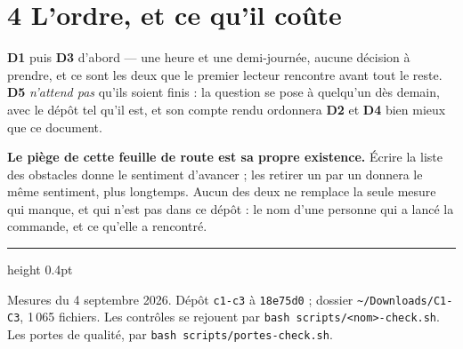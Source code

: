 \documentclass[11pt]{article}
\newcommand{\code}[1]{\texttt{\small #1}}
\newcommand{\mm}[1]{\textbf{#1}}
\begin{document}
\section{4 \;\textbar\; L'ordre, et ce qu'il coûte}

\mm{D1} puis \mm{D3} d'abord --- une heure et une demi-journée, aucune décision à prendre, et ce
sont les deux que le premier lecteur rencontre avant tout le reste. \mm{D5} \emph{n'attend pas}
qu'ils soient finis : la question se pose à quelqu'un dès demain, avec le dépôt tel qu'il est, et
son compte rendu ordonnera \mm{D2} et \mm{D4} bien mieux que ce document.

\begin{these}
\textbf{Le piège de cette feuille de route est sa propre existence.} Écrire la liste des obstacles
donne le sentiment d'avancer ; les retirer un par un donnera le même sentiment, plus longtemps.
Aucun des deux ne remplace la seule mesure qui manque, et qui n'est pas dans ce dépôt : le nom
d'une personne qui a lancé la commande, et ce qu'elle a rencontré.
\end{these}

\vspace{4pt}
{\color{efegray}\hrule height 0.4pt}\vspace{2.5pt}
{\footnotesize\color{efegray}Mesures du 4 septembre 2026. Dépôt \code{c1-c3} à \code{18e75d0} ;
dossier \code{\textasciitilde/Downloads/C1-C3}, 1\,065 fichiers. Les contrôles se rejouent par
\code{bash scripts/<nom>-check.sh}. Les portes de qualité, par
\code{bash scripts/portes-check.sh}.}
\end{document}
